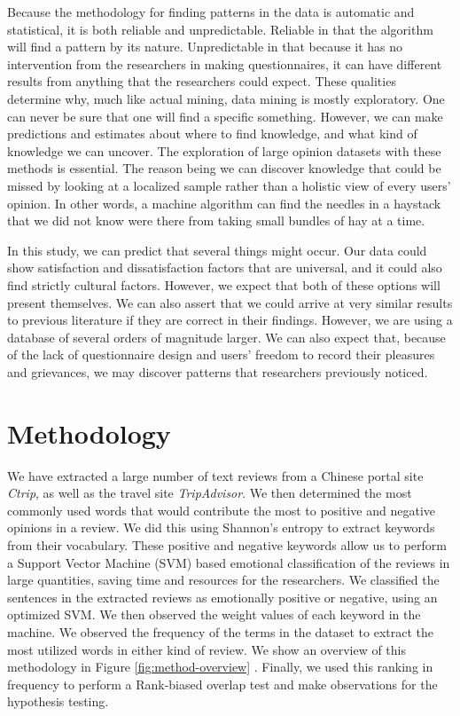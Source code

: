 \documentclass[smallextended,natbib]{svjour3}       %
\begin{document}
Because the methodology for finding patterns in the data is automatic and statistical, it is both reliable and unpredictable. Reliable in that the algorithm will find a pattern by its nature. Unpredictable in that because it has no intervention from the researchers in making questionnaires, it can have different results from anything that the researchers could expect. These qualities determine why, much like actual mining, data mining is mostly exploratory. One can never be sure that one will find a specific something. However, we can make predictions and estimates about where to find knowledge, and what kind of knowledge we can uncover. The exploration of large opinion datasets with these methods is essential. The reason being we can discover knowledge that could be missed by looking at a localized sample rather than a holistic view of every users' opinion. In other words, a machine algorithm can find the needles in a haystack that we did not know were there from taking small bundles of hay at a time.

In this study, we can predict that several things might occur. Our data could show satisfaction and dissatisfaction factors that are universal, and it could also find strictly cultural factors. However, we expect that both of these options will present themselves. We can also assert that we could arrive at very similar results to previous literature if they are correct in their findings. However, we are using a database of several orders of magnitude larger. We can also expect that, because of the lack of questionnaire design and users' freedom to record their pleasures and grievances, we may discover patterns that researchers previously noticed.


\section{Methodology}\label{method}

We have extracted a large number of text reviews from a Chinese portal site \textit{Ctrip}, as well as the travel site \textit{TripAdvisor}. We then determined the most commonly used words that would contribute the most to positive and negative opinions in a review. We did this using Shannon's entropy to extract keywords from their vocabulary. These positive and negative keywords allow us to perform a Support Vector Machine (SVM) based emotional classification of the reviews in large quantities, saving time and resources for the researchers. We classified the sentences in the extracted reviews as emotionally positive or negative, using an optimized SVM. We then observed the weight values of each keyword in the machine. We observed the frequency of the terms in the dataset to extract the most utilized words in either kind of review. We show an overview of this methodology in Figure \ref{fig:method-overview} \cite[][]{Aleman2018ICAROB}. Finally, we used this ranking in frequency to perform a Rank-biased overlap test and make observations for the hypothesis testing.
\end{document}
